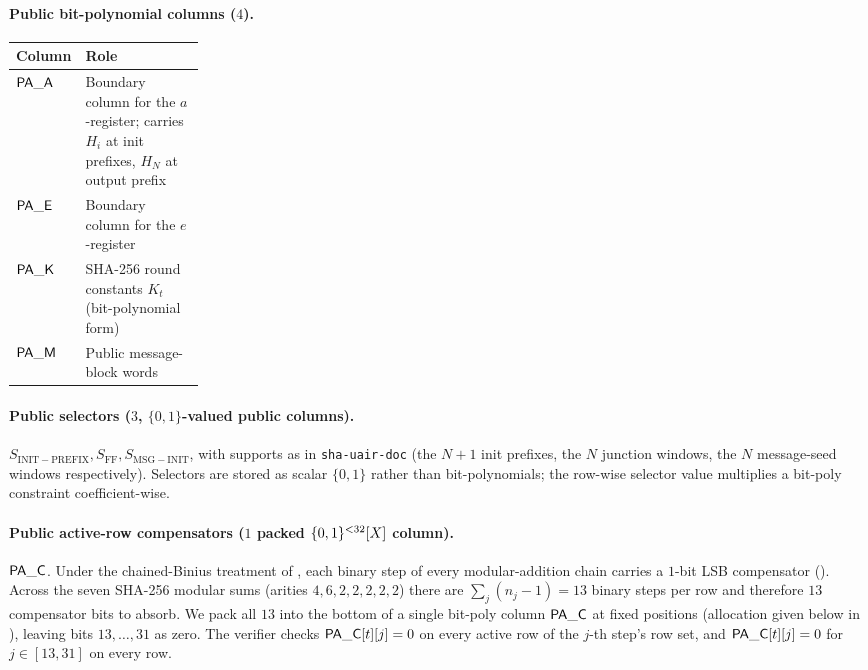 \paragraph{Public bit-polynomial columns ($4$).}
\begin{center}
\small
\begin{tabularx}{\linewidth}{>{\raggedright\arraybackslash}p{0.22\linewidth} >{\raggedright\arraybackslash}X}
\toprule
\textbf{Column} & \textbf{Role} \\
\midrule
$\mathsf{PA\_A}$  & Boundary column for the $a$-register; carries $H_i$ at init prefixes, $H_N$ at output prefix \\
$\mathsf{PA\_E}$  & Boundary column for the $e$-register \\
$\mathsf{PA\_K}$  & SHA-256 round constants $K_t$ (bit-polynomial form) \\
$\mathsf{PA\_M}$  & Public message-block words \\
\bottomrule
\end{tabularx}
\end{center}

\paragraph{Public selectors ($3$, $\{0,1\}$-valued public columns).}
$S_{\mathrm{INIT-PREFIX}}, S_{\mathrm{FF}}, S_{\mathrm{MSG-INIT}}$,
with supports as in \texttt{sha-uair-doc} (the
$N+1$ init prefixes, the $N$ junction windows, the $N$ message-seed
windows respectively). Selectors are stored as scalar $\{0,1\}$ rather
than bit-polynomials; the row-wise selector value multiplies a bit-poly
constraint coefficient-wise.

\paragraph{Public active-row compensators ($1$ packed $\{0,1\}^{<32}[X]$ column).}
$\mathsf{PA\_C}$. Under the chained-Binius treatment of
, each binary step of every
modular-addition chain carries a $1$-bit LSB compensator
(). Across the seven SHA-256 modular sums
(arities $4, 6, 2, 2, 2, 2, 2$) there are $\sum_j (n_j - 1) = 13$
binary steps per row and therefore $13$ compensator bits to absorb.
We pack all $13$ into the bottom of a single bit-poly column
$\mathsf{PA\_C}$ at fixed positions (allocation given below in
), leaving bits $13, \dots, 31$ as zero. The
verifier checks $\mathsf{PA\_C}[t][j] = 0$ on every active row of the
$j$-th step's row set, and $\mathsf{PA\_C}[t][j] = 0$ for $j \in [13,
31]$ on every row.

